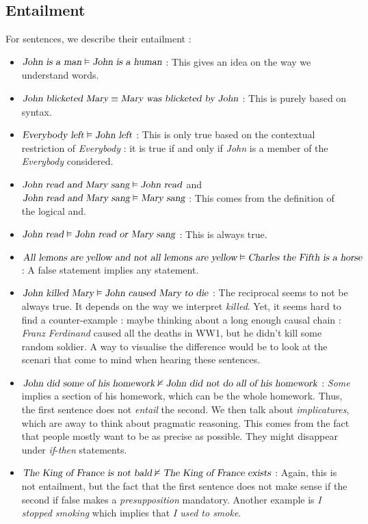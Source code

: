 \documentclass{cours}
\begin{document}
\subsection{Entailment}
For sentences, we describe their entailment\! : 
\begin{itemize}
    \item $\textsl{John is a man} \vDash \textsl{John is a human}$\! : This gives an idea on the way we understand words.
    \item $\textsl{John blicketed Mary} \equiv \textsl{Mary was blicketed by John}$\! : This is purely based on syntax.
    \item $\textsl{Everybody left} \vDash \textsl{John left}$\! : This is only true based on the contextual restriction of \textsl{Everybody}\! : it is true if and only if \textsl{John} is a member of the \textsl{Everybody} considered.
    \item $\textsl{John read and Mary sang} \vDash \textsl{John read}$ and $\textsl{John read and Mary sang} \vDash \textsl{Mary sang}$\! : This comes from the definition of the logical and.
    \item $\textsl{John read} \vDash \textsl{John read or Mary sang}$\! : This is always true.
    \item $\textsl{All lemons are yellow and not all lemons are yellow} \vDash \textsl{Charles the Fifth is a horse}$\! : A false statement implies any statement.
    \item $\textsl{John killed Mary} \vDash \textsl{John caused Mary to die}$\! : The reciprocal seems to not be always true. It depends on the way we interpret \textsl{killed}. Yet, it seems hard to find a counter-example\! : maybe thinking about a long enough causal chain\! : \textsl{Franz Ferdinand} caused all the deaths in WW1, but he didn't kill some random soldier. A way to visualise the difference would be to look at the scenari that come to mind when hearing these sentences. 
    \item $\textsl{John did some of his homework} \nvDash \textsl{John did not do all of his homework}$\! : \textsl{Some} implies a section of his homework, which can be the whole homework. Thus, the first sentence does not \emph{entail} the second. We then talk about \emph{implicatures}, which are away to think about pragmatic reasoning. This comes from the fact that people mostly want to be as precise as possible. They might disappear under \textsl{if}-\textsl{then} statements. 
    \item $\textsl{The King of France is not bald} \nvDash \textsl{The King of France exists}$\! : Again, this is not entailment, but the fact that the first sentence does not make sense if the second if false makes a \emph{presupposition} mandatory. Another example is \textsl{I stopped smoking} which implies that \textsl{I used to smoke}.
\end{itemize}
\end{document}
